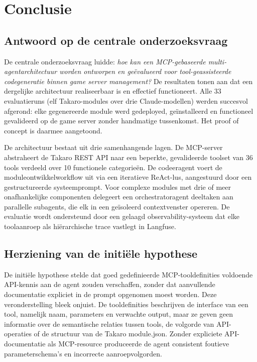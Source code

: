 
\chapter{Conclusie}\label{ch:conclusie}

\section{Antwoord op de centrale onderzoeksvraag}

De centrale onderzoeksvraag luidde: \textit{hoe kan een MCP-gebaseerde multi-agentarchitectuur worden ontworpen en geëvalueerd voor tool-geassisteerde codegeneratie binnen game server management?} De resultaten tonen aan dat een dergelijke architectuur realiseerbaar is en effectief functioneert. Alle 33 evaluatieruns (elf Takaro-modules over drie Claude-modellen) werden succesvol afgerond: elke gegenereerde module werd gedeployed, geïnstalleerd en functioneel gevalideerd op de game server zonder handmatige tussenkomst. Het proof of concept is daarmee aangetoond.

De architectuur bestaat uit drie samenhangende lagen. De MCP-server abstraheert de Takaro REST API naar een beperkte, gevalideerde toolset van 36 tools verdeeld over 10 functionele categorieën. De codeeragent voert de moduleontwikkelworkflow uit via een iteratieve ReAct-lus, aangestuurd door een gestructureerde systeemprompt. Voor complexe modules met drie of meer onafhankelijke componenten delegeert een orchestratoragent deeltaken aan parallelle subagents, die elk in een geïsoleerd contextvenster opereren. De evaluatie wordt ondersteund door een gelaagd observability-systeem dat elke toolaanroep als hiërarchische trace vastlegt in Langfuse.

\section{Herziening van de initiële hypothese}

De initiële hypothese stelde dat goed gedefinieerde MCP-tooldefinities voldoende API-kennis aan de agent zouden verschaffen, zonder dat aanvullende documentatie expliciet in de prompt opgenomen moest worden. Deze veronderstelling bleek onjuist. De tooldefinities beschrijven de interface van een tool, namelijk naam, parameters en verwachte output, maar ze geven geen informatie over de semantische relaties tussen tools, de volgorde van API-operaties of de structuur van de Takaro module.json. Zonder expliciete API-documentatie als MCP-resource produceerde de agent consistent foutieve parameterschema's en incorrecte aanroepvolgorden.

